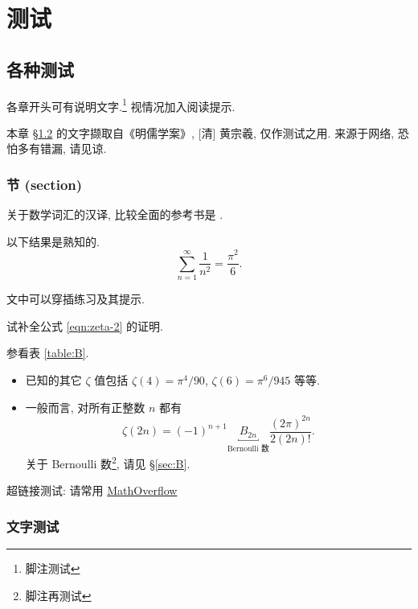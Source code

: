 \documentclass[
	draftmark = true,   %
	fontsetup = font-setup-open.tex,
	titlesetup = titles-setup.tex
]{AJbook}
\begin{document}
	\part{测试}
	\chapter{各种测试}
	各章开头可有说明文字.\footnote{脚注测试} 视情况加入阅读提示.
	\begin{wenxintishi}
		本章 \S\ref{sec:words} 的文字撷取自《明儒学案》, [清] 黄宗羲, 仅作测试之用. 来源于网络, 恐怕多有错漏, 请见谅. 
	\end{wenxintishi}

	\section{节 (section)}
	关于数学词汇的汉译, 比较全面的参考书是 \cite{ZG}.
	\begin{theorem}[L.\ Euler]
		以下结果是熟知的.
		\begin{equation}\label{eqn:zeta-2}
			\sum_{n=1}^\infty \frac{1}{n^2} = \frac{\pi^2}{6}.
		\end{equation}
	\end{theorem}

	文中可以穿插练习及其提示.
	\begin{exercise}\label{exo:Euler}
		试补全公式 \eqref{eqn:zeta-2} 的证明. \begin{hint} 参看表 \ref{table:B}.\end{hint}
	\end{exercise}

	\begin{itemize}
		\item 已知的其它 $\zeta$ 值包括 $\zeta(4) = \pi^4/90$, $\zeta(6) = \pi^6/945$ 等等.
		\item 一般而言, 对所有正整数 $n$ 都有
		\begin{equation}
			\zeta(2n) = (-1)^{n+1} \underbracket{B_{2n}}_{\text{Bernoulli 数}} \frac{(2\pi)^{2n}}{2(2n)!}.
		\end{equation}
		关于 Bernoulli 数\footnote{脚注再测试}, 请见 \S\ref{sec:B}.
	\end{itemize}

	超链接测试: 请常用 \href{http://mathoverflow.net}{MathOverflow}

	\section{文字测试}\label{sec:words}
\end{document}

